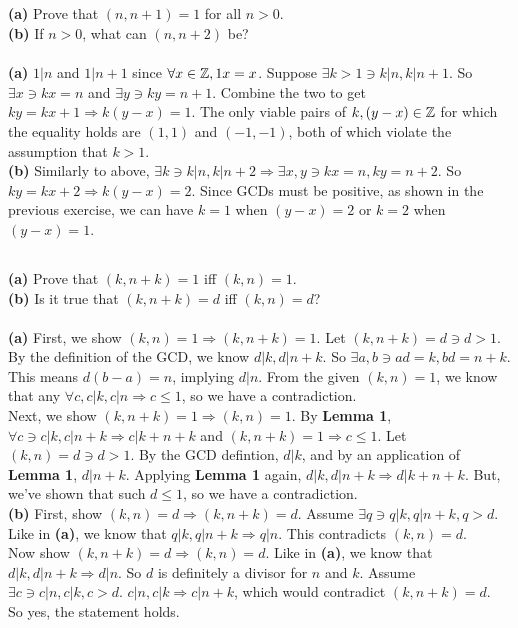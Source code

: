 \documentclass{article}
\begin{document}
\subsection{}
\textbf{(a)} Prove that $(n, n + 1) = 1$ for all $n > 0$.\\
\textbf{(b)} If $n > 0$, what can $(n, n + 2)$ be? \\~\\
\textbf{(a)} $1|n$ and $1|n + 1$ since $\forall x \in \mathbb{Z}, 1x = x$.
Suppose $\exists k > 1 \ni k|n, k|n + 1$.
So $\exists x \ni kx = n$ and $\exists y \ni ky = n + 1$.
Combine the two to get $ky = kx + 1 \Rightarrow k(y - x) = 1$.
The only viable pairs of $k, (y - x) \in \mathbb{Z}$ for which the equality holds are
$(1, 1)$ and $(-1, -1)$, both of which violate the assumption that $k > 1$.\\
\textbf{(b)} Similarly to above, $\exists k \ni k|n, k|n + 2 \Rightarrow
\exists x, y \ni kx = n, ky = n + 2$.
So $ky = kx + 2 \Rightarrow k(y - x) = 2$.
Since GCDs must be positive, as shown in the previous exercise, we can have
$k = 1$ when $(y - x) = 2$ or $k = 2$ when $(y - x) = 1$.

\subsection{}
\textbf{(a)} Prove that $(k, n + k) = 1$ iff $(k, n) = 1$.\\
\textbf{(b)} Is it true that $(k, n + k) = d$ iff $(k, n) = d$?\\~\\
\textbf{(a)} First, we show $(k, n) = 1 \Rightarrow (k, n + k) = 1$.
Let $(k, n + k) = d \ni d > 1$.
By the definition of the GCD, we know $d|k, d|n+k$.
So $\exists a, b \ni ad = k, bd = n + k$.
This means $d(b - a) = n$, implying $d|n$.
From the given $(k, n) = 1$, we know that any $\forall c, c|k, c|n \Rightarrow c \leq 1$,
so we have a contradiction.\\
Next, we show $(k, n + k) = 1 \Rightarrow (k, n) = 1$.
By \textbf{Lemma 1}, $\forall c \ni c|k, c|n+k \Rightarrow c|k+n+k$ and $(k, n + k) = 1 \Rightarrow c \leq 1$.
Let $(k, n) = d \ni d > 1$.
By the GCD defintion, $d|k$, and by an application of \textbf{Lemma 1}, $d|n+k$.
Applying \textbf{Lemma 1} again, $d|k, d|n+k \Rightarrow d|k+n+k$.
But, we've shown that such $d \leq 1$, so we have a contradiction.\\
\textbf{(b)} First, show $(k, n) = d \Rightarrow (k, n + k) = d$.
Assume $\exists q \ni q|k, q|n + k, q > d$.
Like in \textbf{(a)}, we know that $q|k, q|n+k \Rightarrow q|n$.
This contradicts $(k, n) = d$.\\
Now show $(k, n + k) = d \Rightarrow (k, n) = d$.
Like in \textbf{(a)}, we know that $d|k, d|n+k \Rightarrow d|n$.
So $d$ is definitely a divisor for $n$ and $k$.
Assume $\exists c \ni c|n, c|k, c > d$.
$c|n, c|k \Rightarrow c|n+k$, which would contradict $(k, n+k) = d$.\\
So yes, the statement holds.
\end{document}
